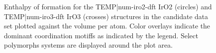 \begin{figure}
\centering
{}
\caption{\label{fig:iro2_al}
Enthalpy of formation for the TEMP|num-iro2-dft IrO2 (circles) and TEMP|num-iro3-dft IrO3 (crosses) structures in the candidate data set plotted against the volume per atom.
%
Color overlays indicate the dominant coordination motiffs as indicated by the legend.
%
Select polymorphs systems are displayed around the plot area.
}
\end{figure}








